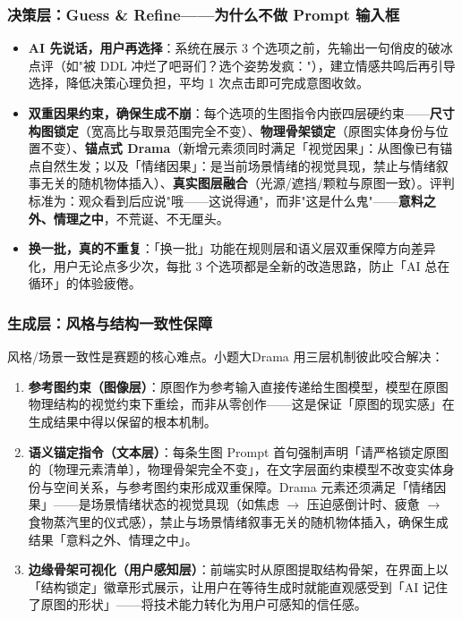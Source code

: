 \documentclass[10pt, a4paper]{article}
\newcommand{\kw}[1]{\textbf{#1}}
\begin{document}
\subsubsection*{决策层：Guess \& Refine——为什么不做 Prompt 输入框}

\begin{itemize}[leftmargin=2em, itemsep=0.3em, topsep=3pt]
  \item \kw{AI 先说话，用户再选择}：系统在展示 3 个选项之前，先输出一句俏皮的破冰点评（如"被 DDL 冲烂了吧哥们？选个姿势发疯："），建立情感共鸣后再引导选择，降低决策心理负担，平均 1 次点击即可完成意图收敛。
  \item \kw{双重因果约束，确保生成不崩}：每个选项的生图指令内嵌四层硬约束——\textbf{尺寸构图锁定}（宽高比与取景范围完全不变）、\textbf{物理骨架锁定}（原图实体身份与位置不变）、\textbf{锚点式 Drama}（新增元素须同时满足「视觉因果」：从图像已有锚点自然生发；以及「情绪因果」：是当前场景情绪的视觉具现，禁止与情绪叙事无关的随机物体插入）、\textbf{真实图层融合}（光源/遮挡/颗粒与原图一致）。评判标准为：观众看到后应说"哦——这说得通"，而非"这是什么鬼"——\textbf{意料之外、情理之中}，不荒诞、不无厘头。
  \item \kw{换一批，真的不重复}：「换一批」功能在规则层和语义层双重保障方向差异化，用户无论点多少次，每批 3 个选项都是全新的改造思路，防止「AI 总在循环」的体验疲倦。
\end{itemize}

\subsubsection*{生成层：风格与结构一致性保障}

风格/场景一致性是赛题的核心难点。小题大Drama 用三层机制彼此咬合解决：

\begin{enumerate}[leftmargin=2em, itemsep=0.3em, topsep=3pt, label=\textbf{\arabic*.}]
  \item \kw{参考图约束（图像层）}：原图作为参考输入直接传递给生图模型，模型在原图物理结构的视觉约束下重绘，而非从零创作——这是保证「原图的现实感」在生成结果中得以保留的根本机制。

  \item \kw{语义锚定指令（文本层）}：每条生图 Prompt 首句强制声明「请严格锁定原图的〔物理元素清单〕，物理骨架完全不变」，在文字层面约束模型不改变实体身份与空间关系，与参考图约束形成双重保障。Drama 元素还须满足「情绪因果」——是场景情绪状态的视觉具现（如焦虑 $\to$ 压迫感倒计时、疲惫 $\to$ 食物蒸汽里的仪式感），禁止与场景情绪叙事无关的随机物体插入，确保生成结果「意料之外、情理之中」。

  \item \kw{边缘骨架可视化（用户感知层）}：前端实时从原图提取结构骨架，在界面上以「结构锁定」徽章形式展示，让用户在等待生成时就能直观感受到「AI 记住了原图的形状」——将技术能力转化为用户可感知的信任感。
\end{enumerate}
\end{document}
